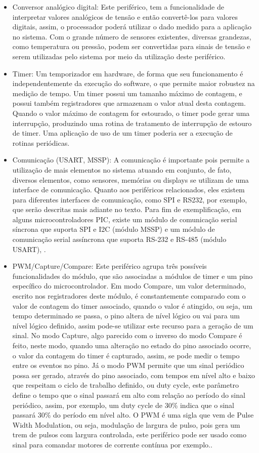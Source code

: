 \begin{itemize}
    \item Conversor analógico digital:
    Este periférico, tem a funcionalidade de interpretar valores analógicos de tensão e então convertê-los para valores digitais, assim, o processador poderá utilizar o dado medido para a aplicação no sistema. Com o grande número de sensores existentes, diversas grandezas, como temperatura ou pressão, podem ser convertidas para sinais de tensão e serem utilizadas pelo sistema por meio da utilização deste periférico.
    \item Timer:
    Um temporizador em hardware, de forma que seu funcionamento é independentemente da execução do software, o que permite maior robustez na medição de tempo. Um timer possui um tamanho máximo de contagem, e possui também registradores que armazenam o valor atual desta contagem. Quando o valor máximo de contagem for estourado, o timer pode gerar uma interrupção, produzindo uma rotina de tratamento de interrupção de estouro de timer. Uma aplicação de uso de um timer poderia ser a execução de rotinas periódicas. 
    \item Comunicação (USART, MSSP):
    A comunicação é importante pois permite a utilização de mais elementos no sistema atuando em conjunto, de fato, diversos elementos, como sensores, memórias ou displays se utilizam de uma interface de comunicação.  Quanto aos periféricos relacionados, eles existem para diferentes interfaces de comunicação, como SPI e RS232, por exemplo, que serão descritas mais adiante no texto. Para fim de exemplificação, em alguns microcontroladores PIC, existe um módulo de comunicação serial síncrona que suporta SPI e I2C (módulo MSSP) e um módulo de comunicação serial assíncrona que suporta RS-232 e RS-485 (módulo USART), \cite{pic18:DS39500A}. 
    \item PWM/Capture/Compare:
    Este periférico agrupa três possíveis funcionalidades do módulo, que são associadas a módulos de timer e um pino específico do microcontrolador. Em modo Compare, um valor determinado, escrito nos registradores deste módulo, é constantemente comparado com o valor de contagem do timer associado, quando o valor é atingido, ou seja, um tempo determinado se passa, o pino altera de nível lógico ou vai para um nível lógico definido, assim pode-se utilizar este recurso para a geração de um sinal. No modo Capture, algo parecido com o inverso do modo Compare é feito, neste modo, quando uma alteração no estado do pino associado ocorre, o valor da contagem do timer é capturado, assim, se pode medir o tempo entre os eventos no pino. Já o modo PWM permite que um sinal periódico possa ser gerado, através do pino associado, com tempos em nível alto e baixo que respeitam o ciclo de trabalho definido, ou duty cycle, este parâmetro define o tempo que o sinal passará em alto com relação ao período do sinal periódico, assim, por exemplo, um duty cycle de 30\% indica que o sinal passará 30\% do período em nível alto. O PWM é uma sigla que vem de Pulse Width Modulation, ou seja, modulação de largura de pulso, pois gera um trem de pulsos com largura controlada, este periférico pode ser usado como sinal para comandar motores de corrente contínua por exemplo.\cite{pic18:DS39500A}. 
\end{itemize}

